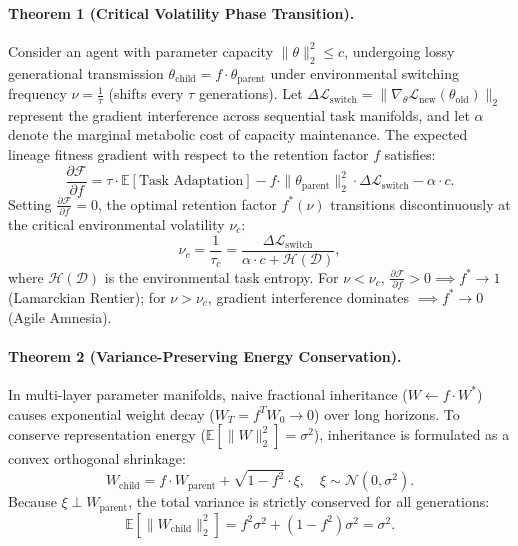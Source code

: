 \documentclass[11pt,a4paper]{article}
\begin{document}
\paragraph{Theorem 1 (Critical Volatility Phase Transition).}
Consider an agent with parameter capacity $\|\theta\|_2^2 \le c$, undergoing lossy generational transmission $\theta_{\text{child}} = f \cdot \theta_{\text{parent}}$ under environmental switching frequency $\nu = \frac{1}{\tau}$ (shifts every $\tau$ generations). Let $\Delta \mathcal{L}_{\text{switch}} = \|\nabla_\theta \mathcal{L}_{\text{new}}(\theta_{\text{old}})\|_2$ represent the gradient interference across sequential task manifolds, and let $\alpha$ denote the marginal metabolic cost of capacity maintenance. The expected lineage fitness gradient with respect to the retention factor $f$ satisfies:
\begin{equation}
    \frac{\partial \mathcal{F}}{\partial f} = \tau \cdot \mathbb{E}[\text{Task Adaptation}] - f \cdot \|\theta_{\text{parent}}\|_2^2 \cdot \Delta \mathcal{L}_{\text{switch}} - \alpha \cdot c.
\end{equation}
Setting $\frac{\partial \mathcal{F}}{\partial f} = 0$, the optimal retention factor $f^*(\nu)$ transitions discontinuously at the critical environmental volatility $\nu_c$:
\begin{equation}
    \nu_c = \frac{1}{\tau_c} = \frac{\Delta \mathcal{L}_{\text{switch}}}{\alpha \cdot c + \mathcal{H}(\mathcal{D})},
\end{equation}
where $\mathcal{H}(\mathcal{D})$ is the environmental task entropy. For $\nu < \nu_c$, $\frac{\partial \mathcal{F}}{\partial f} > 0 \implies f^* \to 1$ (Lamarckian Rentier); for $\nu > \nu_c$, gradient interference dominates $\implies f^* \to 0$ (Agile Amnesia).

\paragraph{Theorem 2 (Variance-Preserving Energy Conservation).}
In multi-layer parameter manifolds, naive fractional inheritance ($W \leftarrow f \cdot W^*$) causes exponential weight decay ($W_T = f^T W_0 \to 0$) over long horizons. To conserve representation energy ($\mathbb{E}[\|W\|_2^2] = \sigma^2$), inheritance is formulated as a convex orthogonal shrinkage:
\begin{equation}
    W_{\text{child}} = f \cdot W_{\text{parent}} + \sqrt{1 - f^2} \cdot \xi, \quad \xi \sim \mathcal{N}(0, \sigma^2).
\end{equation}
Because $\xi \perp W_{\text{parent}}$, the total variance is strictly conserved for all generations:
\begin{equation}
    \mathbb{E}[\|W_{\text{child}}\|_2^2] = f^2 \sigma^2 + (1 - f^2) \sigma^2 = \sigma^2.
\end{equation}
\end{document}
